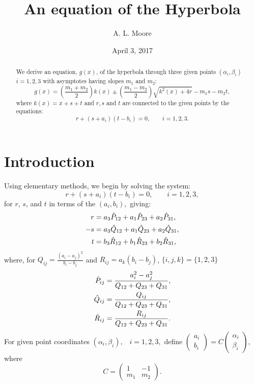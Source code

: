 \documentclass{amsart}
\newcommand{\phat}[1]{\hat{P}_{#1}}
\newcommand{\qhat}[1]{\hat{Q}_{#1}}
\newcommand{\rhat}[1]{\hat{R}_{#1}}
\newcommand{\qsum}{Q_{12} + Q_{23} + Q_{31}}
\begin{document}
\title{An equation of the Hyperbola}
\author{A. L. Moore}
\date{April 3, 2017}
\begin{abstract}
We derive an equation, $g(x)$, of the hyperbola through three given points
$(\alpha_i, \beta_i)$ \, $i = 1, 2, 3$ with asymptotes having slopes
$m_1$ and $m_2$:
\[
  g(x) = (\frac{m_1 + m_2}{2}) k(x) \pm
  (\frac{m_1 - m_2}{2}) \sqrt{k^2(x) + 4 r} - m_1 s - m_2 t,
\]
where $k(x) = x + s + t$ and $r, s$ and $t$ are
connected to the given points by the equations:
\[
  r + (s + a_i) (t - b_i) = 0, \qquad i = 1, 2, 3.
\]
\end{abstract}
\maketitle

\section{Introduction}
Using elementary methods, we begin by solving the system:
\begin{equation}\label{E:rightHyperbola}
  r + (s + a_i) (t - b_i) = 0, \qquad i = 1, 2, 3,
\end{equation}
for $r$, $s$, and $t$ in terms of the $(a_i, b_i),$ giving:
\begin{align}
r &= a_3 \phat{12} + a_1 \phat{23} + a_2 \phat{31}, \notag\\
-s &= a_3 \qhat{12} + a_1 \qhat{23} + a_2 \qhat{31}, \notag\\
  t &= b_3 \rhat{12} + b_1 \rhat{23} + b_2 \rhat{31}, \notag
\end{align}
where, for $Q_{ij} = \frac{(a_i - a_j)^2}{b_i - b_j}$ and
$R_{ij} = a_k (b_i - b_j)$, \quad $\{i, j, k\} = \{1, 2, 3\}$
\begin{align}
\phat{ij} &= \frac{a_i^2 - a_j^2}{\qsum}, \notag\\
\qhat{ij} &= \frac{Q_{ij}}{\qsum}, \notag\\
\rhat{ij} &= \frac{R_{ij}}{\qsum}. \notag
\end{align}
For given point coordinates $(\alpha_i, \beta_i),$ \,
$i = 1, 2, 3,$ define
$\begin{pmatrix}
  a_i\\
  b_i
\end{pmatrix}
= C
\begin{pmatrix}
  \alpha_i\\
  \beta_i
\end{pmatrix},$
where
\[
  C =
    \begin{pmatrix}
      1 & -1\\
      m_1 & m_2
    \end{pmatrix} .
\]
\end{document}
